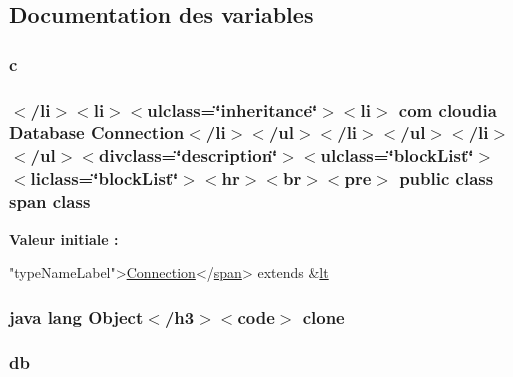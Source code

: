 \subsection{Documentation des variables}
\hypertarget{_connection_8html_ae0323a9039add2978bf5b49550572c7c}{
\subsubsection[{c}]{\setlength{\rightskip}{0pt plus 5cm}c}}\label{_connection_8html_ae0323a9039add2978bf5b49550572c7c}
\hypertarget{_connection_8html_a16291dfa73b82e32206fcfc5da5f834e}{
\subsubsection[{class}]{\setlength{\rightskip}{0pt plus 5cm}$<$/li$>$$<$li$>$$<$ulclass=\char`\"{}inheritance\char`\"{}$>$$<$li$>$ com cloudia Database {\bf Connection}$<$/li$>$$<$/ul$>$$<$/li$>$$<$/ul$>$$<$/li$>$$<$/ul$>$$<$divclass=\char`\"{}description\char`\"{}$>$$<$ulclass=\char`\"{}block\-List\char`\"{}$>$$<$liclass=\char`\"{}block\-List\char`\"{}$>$$<$hr$>$$<$br$>$$<$pre$>$ public class {\bf span} class}}\label{_connection_8html_a16291dfa73b82e32206fcfc5da5f834e}
{\bfseries Valeur initiale \-:}
\begin{DoxyCode}
\textcolor{stringliteral}{"typeNameLabel"}>\hyperlink{_connection_8html_aaf53f3433a3a14fe982456bdae6d53c0}{Connection}</\hyperlink{stylesheet_8css_a8343996ebcf16220b04e54659aac31cc}{span}>
extends &\hyperlink{_sensor_8html_ae966755cef9ee47d2c55292fa9976d38}{lt}
\end{DoxyCode}
\hypertarget{_connection_8html_adc9607fcabf6f2d7f401ad52015ef6e0}{
\subsubsection[{clone}]{\setlength{\rightskip}{0pt plus 5cm}java lang Object$<$/h3$>$$<$code$>$ clone}}\label{_connection_8html_adc9607fcabf6f2d7f401ad52015ef6e0}
\hypertarget{_connection_8html_a89a7f6028a19c3dc081cc5f16eb53891}{
\subsubsection[{db}]{\setlength{\rightskip}{0pt plus 5cm}db}}\label{_connection_8html_a89a7f6028a19c3dc081cc5f16eb53891}
